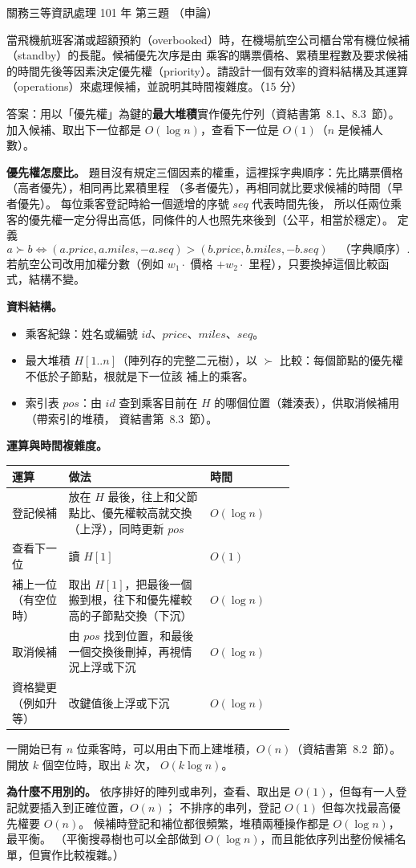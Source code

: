 \begin{pastexam}[label={px:gw3-101-ds-03}]{關務三等資訊處理 101 年 第三題}
（申論）

當飛機航班客滿或超額預約（overbooked）時，在機場航空公司櫃台常有機位候補（standby）的長龍。候補優先次序是由
乘客的購票價格、累積里程數及要求候補的時間先後等因素決定優先權（priority）。請設計一個有效率的資料結構及其運算
（operations）來處理候補，並說明其時間複雜度。（15 分）
\end{pastexam}

\begin{pastsoln}
答案：用以「優先權」為鍵的\textbf{最大堆積}實作優先佇列（資結書第~8.1、8.3~節）。 加入候補、取出下一位都是
$O(\log n)$，查看下一位是 $O(1)$（$n$ 是候補人數）。

\textbf{優先權怎麼比。} 題目沒有規定三個因素的權重，這裡採字典順序：先比購票價格（高者優先），相同再比累積里程
（多者優先），再相同就比要求候補的時間（早者優先）。 每位乘客登記時給一個遞增的序號 $\mathit{seq}$ 代表時間先後，
所以任兩位乘客的優先權一定分得出高低，同條件的人也照先來後到（公平，相當於穩定）。 定義
\[
a \succ b \iff (a.\mathit{price}, a.\mathit{miles}, -a.\mathit{seq}) > (b.\mathit{price}, b.\mathit{miles}, -b.\mathit{seq})
\quad\text{（字典順序）}.
\]
若航空公司改用加權分數（例如 $w_1 \cdot$ 價格 $+ w_2 \cdot$ 里程），只要換掉這個比較函式，結構不變。

\textbf{資料結構。}
\begin{itemize}
\item 乘客紀錄：姓名或編號 $\mathit{id}$、$\mathit{price}$、$\mathit{miles}$、$\mathit{seq}$。
\item 最大堆積 $H[1..n]$（陣列存的完整二元樹），以 $\succ$ 比較：每個節點的優先權不低於子節點，根就是下一位該
補上的乘客。
\item 索引表 $\mathit{pos}$：由 $\mathit{id}$ 查到乘客目前在 $H$ 的哪個位置（雜湊表），供取消候補用（帶索引的堆積，
資結書第~8.3~節）。
\end{itemize}

\textbf{運算與時間複雜度。}
\begin{center}
\begin{tabular}{p{0.2\linewidth}p{0.5\linewidth}l}
\toprule
運算 & 做法 & 時間 \\
\midrule
登記候補 & 放在 $H$ 最後，往上和父節點比、優先權較高就交換（上浮），同時更新 $\mathit{pos}$ & $O(\log n)$ \\
查看下一位 & 讀 $H[1]$ & $O(1)$ \\
補上一位（有空位時） & 取出 $H[1]$，把最後一個搬到根，往下和優先權較高的子節點交換（下沉） & $O(\log n)$ \\
取消候補 & 由 $\mathit{pos}$ 找到位置，和最後一個交換後刪掉，再視情況上浮或下沉 & $O(\log n)$ \\
資格變更（例如升等） & 改鍵值後上浮或下沉 & $O(\log n)$ \\
\bottomrule
\end{tabular}
\end{center}
一開始已有 $n$ 位乘客時，可以用由下而上建堆積，$O(n)$（資結書第~8.2~節）。 開放 $k$ 個空位時，取出 $k$ 次，
$O(k \log n)$。

\textbf{為什麼不用別的。} 依序排好的陣列或串列，查看、取出是 $O(1)$，但每有一人登記就要插入到正確位置，$O(n)$；
不排序的串列，登記 $O(1)$ 但每次找最高優先權要 $O(n)$。 候補時登記和補位都很頻繁，堆積兩種操作都是
$O(\log n)$，最平衡。 （平衡搜尋樹也可以全部做到 $O(\log n)$，而且能依序列出整份候補名單，但實作比較複雜。）
\end{pastsoln}
